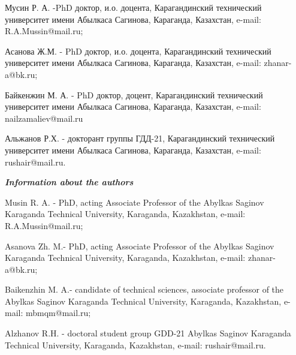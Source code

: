 \begin{noparindent}
Мусин Р. А. -PhD доктор, и.о. доцента, Карагандинский технический
университет имени Абылкаса Сагинова, Караганда, Казахстан, e-mail:
R.A.Mussin@mail.ru;

Асанова Ж.М. - PhD доктор, и.о. доцента, Карагандинский технический
университет имени Абылкаса Сагинова, Караганда, Казахстан, e-mail:
zhanar-a@bk.ru;

Байкенжин М. А. - PhD доктор, доцент, Карагандинский технический
университет имени Абылкаса Сагинова, Караганда, Казахстан, e-mail:
nailzamaliev@mail.ru

Альжанов Р.Х. - докторант группы ГДД-21, Карагандинский технический
университет имени Абылкаса Сагинова, Караганда, Казахстан, e-mail:
rushair@mail.ru.
\end{noparindent}

\emph{{\bfseries Information about the authors}}

\begin{noparindent}
Musin R. A. - PhD, acting Associate Professor of the Abylkas Saginov
Karaganda Technical University, Karaganda, Kazakhstan, e-mail:
R.A.Mussin@mail.ru;

Asanova Zh. M.- PhD, acting Associate Professor of the Abylkas Saginov
Karaganda Technical University, Karaganda, Kazakhstan, e-mail:
zhanar-a@bk.ru;

Baikenzhin M. A.- candidate of technical sciences, associate professor
of the Abylkas Saginov Karaganda Technical University, Karaganda,
Kazakhstan, e-mail: mbmqm@mail.ru;

Alzhanov R.H. - doctoral student group GDD-21 Abylkas Saginov Karaganda
Technical University, Karaganda, Kazakhstan, e-mail: rushair@mail.ru.
\end{noparindent}

